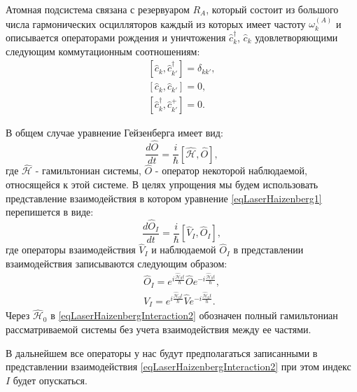 Атомная подсистема связана с резервуаром $R_A$, который состоит из
большого числа гармонических осцилляторов каждый из которых имеет
частоту $\omega_k^{(A)}$ и описывается операторами рождения и
уничтожения $\hat{c}_k^{\dag}$, $\hat{c}_k$ удовлетворяющими следующим
коммутационным соотношениям:
\begin{eqnarray}
\left[\hat{c}_k, \hat{c}^{\dag}_{k'}\right] = \delta_{kk'},
\nonumber \\
\left[\hat{c}_k, \hat{c}_{k'}\right] = 0,
\nonumber \\
\left[\hat{c}^{\dag}_k, \hat{c}^{+}_{k'}\right] = 0.
\nonumber
\end{eqnarray}

В общем случае уравнение Гейзенберга имеет вид:
\begin{equation}
\frac{d \hat{O}}{d t} = \frac{i}{\hbar}\left[\hat{\mathcal{H}},
  \hat{O}\right], 
\label{eqLaserHaizenberg1}
\end{equation}
где $\hat{\mathcal{H}}$ - гамильтониан системы, $\hat{O}$ - оператор
некоторой наблюдаемой, относящейся к этой системе. В целях упрощения
мы будем использовать представление взаимодействия в котором уравнение
\eqref{eqLaserHaizenberg1} перепишется в виде:
\begin{equation}
\frac{d \hat{O}_I}{d t} = \frac{i}{\hbar}\left[\hat{V}_I,
  \hat{O}_I\right], 
\label{eqLaserHaizenbergInteraction1}
\end{equation}
где операторы взаимодействия $\hat{V}_I$ и наблюдаемой $\hat{O}_I$ в
представлении взаимодействия записываются следующим образом: 
\begin{eqnarray}
\hat{O}_I = 
e^{i\frac{\hat{\mathcal{H}}_0t}{\hbar}}
\hat{O}
e^{-i\frac{\hat{\mathcal{H}}_0t}{\hbar}},
\nonumber \\
\hat{V}_I = 
e^{i\frac{\hat{\mathcal{H}}_0t}{\hbar}}
\hat{V}
e^{-i\frac{\hat{\mathcal{H}}_0t}{\hbar}}.
\label{eqLaserHaizenbergInteraction2}
\end{eqnarray}
Через $\hat{\mathcal{H}}_0$ в \eqref{eqLaserHaizenbergInteraction2}
обозначен полный гамильтониан рассматриваемой системы без учета
взаимодействия между ее частями. 

В дальнейшем все операторы у нас будут предполагаться записанными в
представлении взаимодействия \eqref{eqLaserHaizenbergInteraction2} при
этом индекс $I$ будет опускаться.

